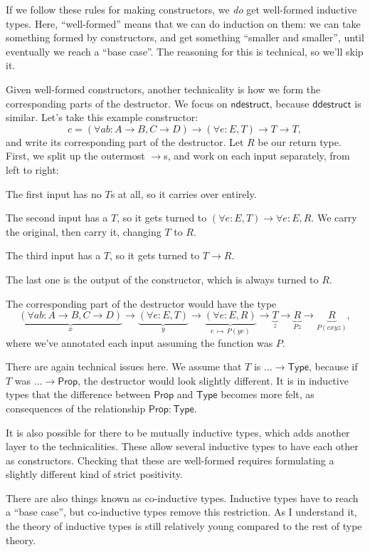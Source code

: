 \documentclass[11pt,paper=letter]{scrartcl}
\newcommand{\sf}{\mathsf}
\newcommand{\prop}{\mathsf{Prop}}
\newcommand{\type}{\mathsf{Type}}
\newcommand{\smapsto}{\,\mapsto\,}
\begin{document}
If we follow these rules for making constructors, we \emph{do} get well-formed inductive types. Here, ``well-formed'' means that we can do induction on them: we can take something formed by constructors, and get something ``smaller and smaller'', until eventually we reach a ``base case''. The reasoning for this is technical, so we'll skip it.

Given well-formed constructors, another technicality is how we form the corresponding parts of the destructor. We focus on $\sf{ndestruct}$, because $\sf{ddestruct}$ is similar. Let's take this example constructor: \[
c = \left(\forall ab: A \to B, C \to D\right) \to (\forall e: E, T) \to T \to T,
\]
and write its corresponding part of the destructor. Let $R$ be our return type. First, we split up the outermost $\to$s, and work on each input separately, from left to right:
\begin{itemthin}
\item The first input has no $T$s at all, so it carries over entirely.
\item The second input has a $T$, so it gets turned to $(\forall e: E, T) \to \forall e: E, R$. We carry the original, then carry it, changing $T$ to $R$.
\item The third input has a $T$, so it gets turned to $T \to R$.
\item The last one is the output of the constructor, which is always turned to $R$.
\end{itemthin}
The corresponding part of the destructor would have the type \[
\underbrace{\left(\forall ab: A \to B, C \to D\right)}_{x} \to
\underbrace{(\forall e: E, T)}_{y} \to
\underbrace{(\forall e: E, R)}_{e\smapsto P(ye)} \to
\underbrace{T}_{z} \to
\underbrace{R}_{Pz} \to
\underbrace{R}_{P(cxyz)},
\]
where we've annotated each input assuming the function was $P$.

There are again technical issues here. We assume that $T$ is $\dots \to \type$, because if $T$ was $\dots \to \prop$, the destructor would look slightly different. It is in inductive types that the difference between $\prop$ and $\type$ becomes more felt, as consequences of the relationship $\prop : \type$.

It is also possible for there to be mutually inductive types, which adds another layer to the technicalities. These allow several inductive types to have each other as constructors. Checking that these are well-formed requires formulating a slightly different kind of strict positivity.

There are also things known as co-inductive types. Inductive types have to reach a ``base case'', but co-inductive types remove this restriction. As I understand it, the theory of inductive types is still relatively young compared to the rest of type theory.
\end{document}
